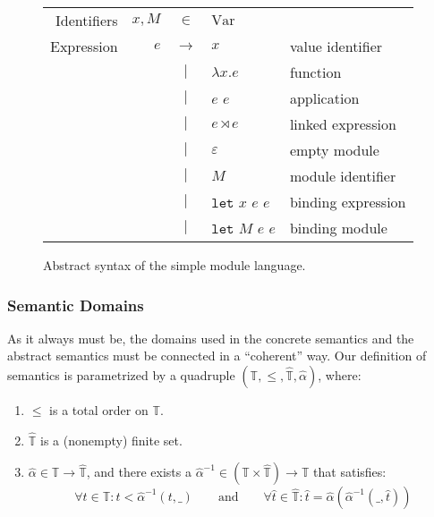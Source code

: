 \documentclass{article}
\theoremstyle{definition}
\newcommand*{\vbar}{|}
\newcommand*{\ExprVar}{\text{Var}}
\newcommand*{\Time}{\mathbb{T}}
\newcommand*{\link}[2]{{#1}\rtimes{#2}}
\newcommand*{\Let}{\mathtt{let}}
\begin{document}
\begin{figure}[htb]
  \centering
  \begin{tabular}{rrcll}
    Identifiers & $x,M$ & $\in$         & $\ExprVar$                              \\
    Expression  & $e$   & $\rightarrow$ & $x$                & value identifier   \\
                &       & $\vbar$       & $\lambda x.e$      & function           \\
                &       & $\vbar$       & $e$ $e$            & application        \\
                &       & $\vbar$       & $\link{e}{e}$      & linked expression  \\
                &       & $\vbar$       & $\varepsilon$      & empty module       \\
                &       & $\vbar$       & $M$                & module identifier  \\
                &       & $\vbar$       & $\Let$ $x$ $e$ $e$ & binding expression \\
                &       & $\vbar$       & $\Let$ $M$ $e$ $e$ & binding module     \\
  \end{tabular}
  \caption{Abstract syntax of the simple module language.}
\end{figure}

\subsubsection{Semantic Domains}
As it always must be, the domains used in the concrete semantics and the abstract semantics must be connected in a ``coherent'' way.
Our definition of semantics is parametrized by a quadruple $(\Time,\le,\widehat{\Time},\widehat{\alpha})$, where:
\begin{enumerate}
  \item $\le$ is a total order on $\Time$.
  \item $\widehat{\Time}$ is a (nonempty) finite set.
  \item $\widehat{\alpha}\in\Time\rightarrow\widehat{\Time}$, and there exists a $\widehat{\alpha}^{-1}\in(\Time\times\widehat{\Time})\rightarrow\Time$ that satisfies:
        \[\forall t\in\Time:t<\widehat{\alpha}^{-1}(t,\_)\qquad\text{and}\qquad\forall\hat{t}\in\widehat{\Time}:\hat{t}=\widehat{\alpha}(\widehat{\alpha}^{-1}(\_,\hat{t}))\]
\end{enumerate}
\end{document}
